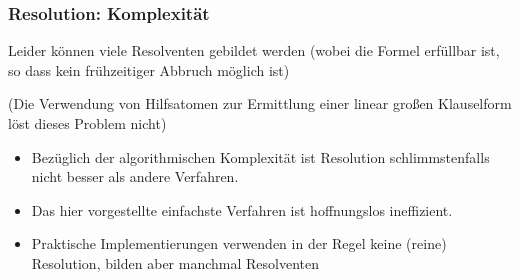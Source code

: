 \documentclass[aspectratio=1610,onlymath]{beamer}
\begin{document}
\begin{frame}\frametitle{Resolution: Komplexität}

Leider können  viele Resolventen gebildet werden
(wobei die Formel erfüllbar ist, so dass kein frühzeitiger Abbruch möglich ist)
\medskip

\textcolor{devilscss}{(Die Verwendung von Hilfsatomen zur Ermittlung einer linear großen Klauselform löst dieses Problem nicht)}
\bigskip

\begin{itemize}
\item Bezüglich der algorithmischen Komplexität ist Resolution schlimmstenfalls \alert{nicht besser als andere Verfahren}.
\item Das hier vorgestellte einfachste Verfahren ist \alert{hoffnungslos ineffizient}.
\item Praktische Implementierungen verwenden in der Regel \alert{keine (reine) Resolution}, bilden aber manchmal Resolventen
\end{itemize}
\medskip


\end{frame}

% 
% 
% 




\end{document}
